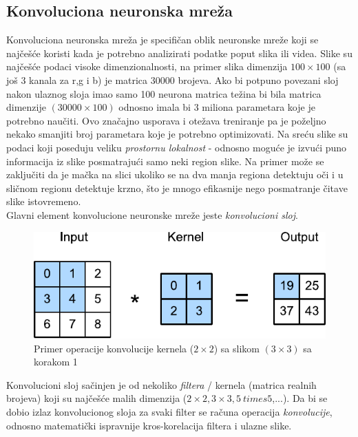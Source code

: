 \documentclass[a4paper,fleqn,12pt]{JMThesis}
\theoremstyle{plain}
\theoremstyle{definition}
\theoremstyle{definition}
\begin{document}
\subsection{Konvoluciona neuronska mreža}
Konvoluciona neuronska mreža je specifičan oblik neuronske mreže koji se najčešće koristi kada je potrebno analizirati podatke
poput slika ili videa. Slike su najčešće podaci visoke dimenzionalnosti, na primer slika dimenzija $100 \times 100$ (sa još 3 kanala
za r,g i b) je matrica 30000 brojeva. Ako bi potpuno povezani sloj nakon ulaznog sloja imao samo 100 neurona matrica težina bi bila
matrica dimenzije $(30000 \times 100)$ odnosno imala bi 3 miliona parametara koje je potrebno naučiti. Ovo značajno usporava i otežava
treniranje pa je poželjno nekako smanjiti broj parametara koje je potrebno optimizovati. Na sreću slike su podaci koji poseduju
veliku \textit{prostornu lokalnost} - odnosno moguće je izvući puno informacija iz slike posmatrajući samo neki region slike.
Na primer može se zaključiti da je mačka na slici ukoliko se na dva manja regiona detektuju oči i u sličnom regionu detektuje
krzno, što je mnogo efikasnije nego posmatranje čitave slike istovremeno. \\
Glavni element konvolucione neuronske mreže jeste \textit{konvolucioni sloj}.
\begin{figure}[!ht]
	\centering
    \includegraphics{../graph-visuals/convolution-example.pdf}
	\caption{Primer operacije konvolucije kernela ($2 \times 2$) sa slikom $(3 \times 3)$ sa korakom 1}
\end{figure}
Konvolucioni sloj sačinjen je od nekoliko \textit{filtera} / kernela (matrica realnih brojeva) koji su najčešće malih dimenzija ($2\times 2,3 \times 3,5 \ times 5$,...).
Da bi se dobio izlaz konvolucionog sloja za svaki filter se računa operacija \textit{konvolucije}, odnosno matematički ispravnije
kros-korelacija filtera i ulazne slike.
\end{document}

